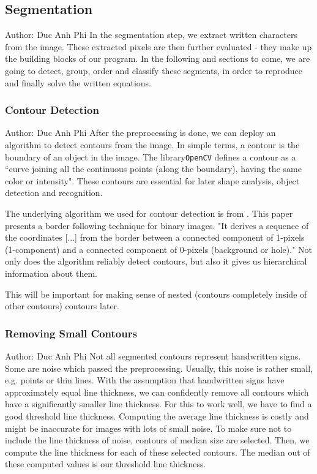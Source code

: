 \documentclass[12pt]{article}
\begin{document}
	
	
	
	\subsection{Segmentation}
		\small{Author: Duc Anh Phi} \newline \newline
	In the segmentation step, we extract written characters from the image.
	These extracted pixels are then further evaluated - they make up the building blocks of our program.
	In the following and sections to come, we are going to detect, group, order and classify these segments, in order to
	reproduce and finally solve the written equations.
	
	\subsubsection{Contour Detection}
	\small{Author: Duc Anh Phi} \newline \newline
	After the preprocessing is done, we can deploy an algorithm to detect contours from the image.
	In simple terms, a contour is the boundary of an object in the image.
	The library\texttt{OpenCV} defines a contour as a ``curve joining all the continuous points (along the boundary), having the same color or intensity".
	These contours are essential for later shape analysis, object detection and recognition.
	
	The underlying algorithm we used for contour detection is from \cite{suzuki1985}.
	This paper presents a border following technique for binary images. "It derives a sequence of the coordinates [...]
	from the border between a connected component of 1-pixels (1-component) and a connected component of 0-pixels (background or hole)."
	Not only does the algorithm reliably detect contours, but also it gives us hierarchical information about them.
	
	This will be important for making sense of nested (contours completely inside of other contours) contours later.
	
	\subsubsection{Removing Small Contours}
	\small{Author: Duc Anh Phi} \newline \newline
	Not all segmented contours represent handwritten signs.
	Some are noise which passed the preprocessing. Usually, this noise is rather small, e.g. points or thin lines.
	With the assumption that handwritten signs have approximately equal line thickness, we can confidently remove all contours which have a significantly smaller line thickness.
	For this to work well, we have to find a good threshold line thickness.
	Computing the average line thickness is costly and might be inaccurate for images with lots of small noise.
	To make sure not to include the line thickness of noise, contours of median size are selected. Then, we compute the line thickness for each of these selected contours.
	The median out of these computed values is our threshold line thickness.
	
\end{document}

